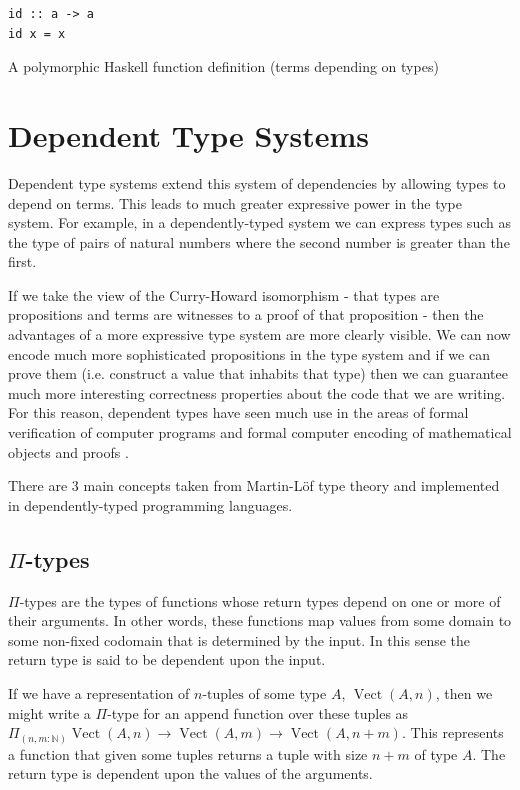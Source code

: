 \documentclass[a4paper, notitlepage]{report}
\begin{document}
\begin{listing}[H]
\begin{verbatim}
id :: a -> a
id x = x
\end{verbatim}
\caption{A polymorphic Haskell function definition (terms depending on types)}
\end{listing}

\section{Dependent Type Systems}
\label{sec:orge219adf}
Dependent type systems extend this system of dependencies by allowing types to
depend on terms. This leads to much greater expressive power in the type system.
For example, in a dependently-typed system we can express types such as the type
of pairs of natural numbers where the second number is greater than the first.

If we take the view of the Curry-Howard isomorphism - that types are
propositions and terms are witnesses to a proof of that proposition - then the
advantages of a more expressive type system are more clearly visible. We can now
encode much more sophisticated propositions in the type system and if we can
prove them (i.e. construct a value that inhabits that type) then we can
guarantee much more interesting correctness properties about the code that we
are writing. For this reason, dependent types have seen much use in the areas of
formal verification of computer programs and formal computer encoding of
mathematical objects and proofs \cite{gonthier_formal_2008,leroy_compiler_2009}.

There are 3 main concepts taken from Martin-Löf type theory and implemented in
dependently-typed programming languages.

\subsection{\texorpdfstring{$\Pi$}{Pi}-types}
\label{sec:orge133a38}
\(\Pi\)-types are the types of functions whose return types depend on one or more of
their arguments. In other words, these functions map values from some domain to
some non-fixed codomain that is determined by the input. In this sense the
return type is said to be dependent upon the input.

If we have a representation of \(n\textrm{-tuples}\) of some type \(A\),
\(\operatorname{Vect}(A,n)\), then we might write a \(\Pi\)-type for an append
function over these tuples as \(\Pi_{(n, m \mathbin{:} {\mathbb N})}
\operatorname{Vect}(A,n) \rightarrow \operatorname{Vect}(A,m) \rightarrow
\operatorname{Vect}(A,n\mathbin{+}m)\). This represents a function that given
some tuples returns a tuple with size \(n\mathbin{+}m\) of type \(A\). The return
type is dependent upon the values of the arguments.
\end{document}
